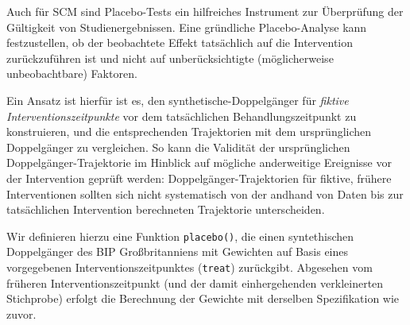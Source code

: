 \documentclass[
  a4paper,
  DIV=11,
  oneside]{scrreprt}
\begin{document}
Auch für SCM sind Placebo-Tests ein hilfreiches Instrument zur
Überprüfung der Gültigkeit von Studienergebnissen. Eine gründliche
Placebo-Analyse kann festzustellen, ob der beobachtete Effekt
tatsächlich auf die Intervention zurückzuführen ist und nicht auf
unberücksichtigte (möglicherweise unbeobachtbare) Faktoren.

Ein Ansatz ist hierfür ist es, den synthetische-Doppelgänger für
\emph{fiktive Interventionszeitpunkte} vor dem tatsächlichen
Behandlungszeitpunkt zu konstruieren, und die entsprechenden
Trajektorien mit dem ursprünglichen Doppelgänger zu vergleichen. So kann
die Validität der ursprünglichen Doppelgänger-Trajektorie im Hinblick
auf mögliche anderweitige Ereignisse vor der Intervention geprüft
werden: Doppelgänger-Trajektorien für fiktive, frühere Interventionen
sollten sich nicht systematisch von der andhand von Daten bis zur
tatsächlichen Intervention berechneten Trajektorie unterscheiden.

Wir definieren hierzu eine Funktion \texttt{placebo()}, die einen
syntethischen Doppelgänger des BIP Großbritanniens mit Gewichten auf
Basis eines vorgegebenen Interventionszeitpunktes (\texttt{treat})
zurückgibt. Abgesehen vom früheren Interventionszeitpunkt (und der damit
einhergehenden verkleinerten Stichprobe) erfolgt die Berechnung der
Gewichte mit derselben Spezifikation wie zuvor.
\end{document}

